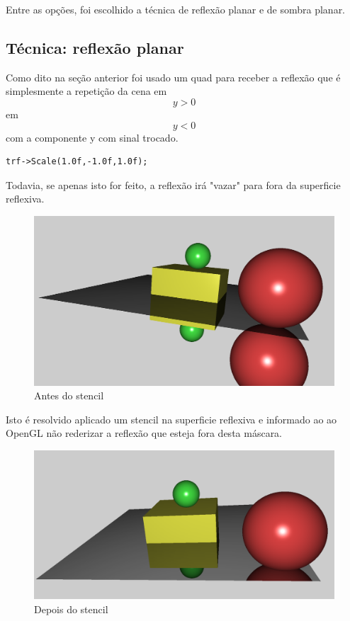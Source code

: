 \documentclass[11pt, a4paper]{article}
\begin{document}
Entre as opções, foi escolhido a técnica de reflexão planar e de sombra planar.

\subsection {Técnica: reflexão planar}

Como dito na seção anterior foi usado um quad para receber a reflexão que é 
simplesmente a repetição da cena em $$y > 0$$ em $$y < 0$$ com a componente y
com sinal trocado.

\begin{verbatim}
trf->Scale(1.0f,-1.0f,1.0f);
\end{verbatim}

Todavia, se apenas isto for feito, a reflexão irá "vazar" para fora da superficie
reflexiva.

\begin{figure}[H]
  \begin{center}
  \includegraphics[width=0.8\linewidth]{before-stencil.png}
  \caption{Antes do stencil}
  \label{fig:vaz}
  \end{center}
\end{figure}

Isto é resolvido aplicado um stencil na superficie reflexiva e informado ao 
ao OpenGL não rederizar a reflexão que esteja fora desta máscara.

\begin{figure}[H]
  \begin{center}
  \includegraphics[width=0.8\linewidth]{after-stencil.png}
  \caption{Depois do stencil}
  \label{fig:vaz}
  \end{center}
\end{figure}
\end{document}
